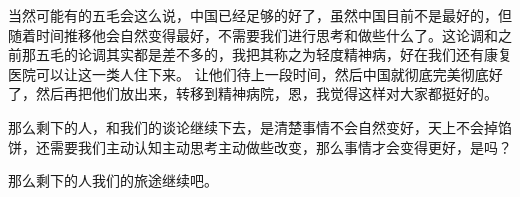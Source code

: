 \documentclass[12pt,oneside]{book}
\begin{document}
\begin{common-format}
当然可能有的五毛会这么说，中国已经足够的好了，虽然中国目前不是最好的，但随着时间推移他会自然变得最好，不需要我们进行思考和做些什么了。这论调和之前那五毛的论调其实都是差不多的，我把其称之为轻度精神病，好在我们还有康复医院可以让这一类人住下来。 让他们待上一段时间，然后中国就彻底完美彻底好了，然后再把他们放出来，转移到精神病院，恩，我觉得这样对大家都挺好的。

那么剩下的人，和我们的谈论继续下去，是清楚事情不会自然变好，天上不会掉馅饼，还需要我们主动认知主动思考主动做些改变，那么事情才会变得更好，是吗？

那么剩下的人我们的旅途继续吧。﻿

\end{common-format}


\setcounter{tocdepth}{2}
\tableofcontents
\end{document}
